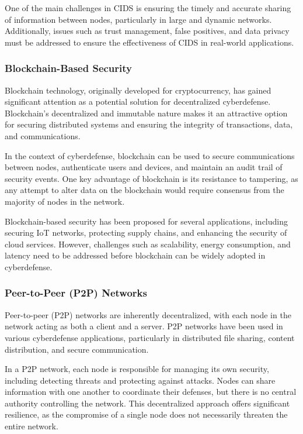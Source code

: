 One of the main challenges in CIDS is ensuring the timely and accurate sharing of information between nodes, particularly in large and dynamic networks. Additionally, issues such as trust management, false positives, and data privacy must be addressed to ensure the effectiveness of CIDS in real-world applications.

\subsubsection{Blockchain-Based Security}

Blockchain technology, originally developed for cryptocurrency, has gained significant attention as a potential solution for decentralized cyberdefense. Blockchain's decentralized and immutable nature makes it an attractive option for securing distributed systems and ensuring the integrity of transactions, data, and communications.

In the context of cyberdefense, blockchain can be used to secure communications between nodes, authenticate users and devices, and maintain an audit trail of security events. One key advantage of blockchain is its resistance to tampering, as any attempt to alter data on the blockchain would require consensus from the majority of nodes in the network.

Blockchain-based security has been proposed for several applications, including securing IoT networks, protecting supply chains, and enhancing the security of cloud services. However, challenges such as scalability, energy consumption, and latency need to be addressed before blockchain can be widely adopted in cyberdefense.

\subsubsection{Peer-to-Peer (P2P) Networks}

Peer-to-peer (P2P) networks are inherently decentralized, with each node in the network acting as both a client and a server. P2P networks have been used in various cyberdefense applications, particularly in distributed file sharing, content distribution, and secure communication.

In a P2P network, each node is responsible for managing its own security, including detecting threats and protecting against attacks. Nodes can share information with one another to coordinate their defenses, but there is no central authority controlling the network. This decentralized approach offers significant resilience, as the compromise of a single node does not necessarily threaten the entire network.

